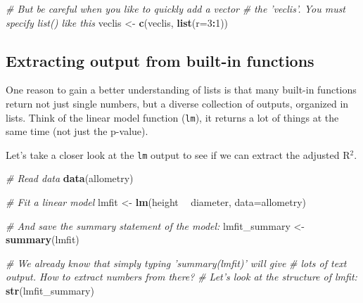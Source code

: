 \documentclass[]{book}
\newenvironment{Shaded}{\begin{snugshade}}{\end{snugshade}}
\newcommand{\CommentTok}[1]{\textcolor[rgb]{0.56,0.35,0.01}{\textit{#1}}}
\newcommand{\DataTypeTok}[1]{\textcolor[rgb]{0.13,0.29,0.53}{#1}}
\newcommand{\DecValTok}[1]{\textcolor[rgb]{0.00,0.00,0.81}{#1}}
\newcommand{\KeywordTok}[1]{\textcolor[rgb]{0.13,0.29,0.53}{\textbf{#1}}}
\newcommand{\NormalTok}[1]{#1}
\newcommand{\OperatorTok}[1]{\textcolor[rgb]{0.81,0.36,0.00}{\textbf{#1}}}
\newcommand{\StringTok}[1]{\textcolor[rgb]{0.31,0.60,0.02}{#1}}
\begin{document}
\begin{Shaded}
\begin{Highlighting}[]
\CommentTok{# But be careful when you like to quickly add a vector}
\CommentTok{# the 'veclis'. You must specify list() like this}
\NormalTok{veclis <-}\StringTok{ }\KeywordTok{c}\NormalTok{(veclis, }\KeywordTok{list}\NormalTok{(}\DataTypeTok{r=}\DecValTok{3}\OperatorTok{:}\DecValTok{1}\NormalTok{))}
\end{Highlighting}
\end{Shaded}

\hypertarget{extracting-output-from-built-in-functions}{%
\subsection{Extracting output from built-in functions}\label{extracting-output-from-built-in-functions}}

One reason to gain a better understanding of lists is that many built-in functions return not just single numbers, but a diverse collection of outputs, organized in lists. Think of the linear model function (\texttt{lm}), it returns a lot of things at the same time (not just the p-value).

Let's take a closer look at the \texttt{lm} output to see if we can extract the adjusted R\(^2\).

\begin{Shaded}
\begin{Highlighting}[]
\CommentTok{# Read data}
\KeywordTok{data}\NormalTok{(allometry)}

\CommentTok{# Fit a linear model}
\NormalTok{lmfit <-}\StringTok{ }\KeywordTok{lm}\NormalTok{(height }\OperatorTok{~}\StringTok{ }\NormalTok{diameter, }\DataTypeTok{data=}\NormalTok{allometry)}

\CommentTok{# And save the summary statement of the model:}
\NormalTok{lmfit_summary <-}\StringTok{ }\KeywordTok{summary}\NormalTok{(lmfit)}

\CommentTok{# We already know that simply typing 'summary(lmfit)' will give }
\CommentTok{# lots of text output. How to extract numbers from there?}
\CommentTok{# Let's look at the structure of lmfit:}
\KeywordTok{str}\NormalTok{(lmfit_summary)}
\end{Highlighting}
\end{Shaded}
\end{document}
